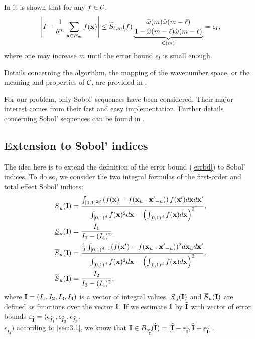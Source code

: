 In \cite[Sec. 4.2]{HicJim} it is shown that for any $f\in\mathcal{C}$,
\begin{equation}
\left\lvert I - \frac{1}{b^m}\sum_{\boldsymbol{\mathbf{x}}\in\mathcal{P}_m}f(\boldsymbol{\mathbf{x}})\right\rvert
\le \widetilde{S}_{\ell,m}(f)\underbrace{\frac{\widehat{\omega}(m) \mathring{\omega}(m-\ell)}{1 - \widehat{\omega}(m-\ell) \mathring{\omega}(m-\ell)}}_{\mathfrak{C}(m)}=\epsilon_{I}, \label{errbd}
\end{equation}
where one may increase $m$ until the error bound $\epsilon_{I}$ is small enough.

Details concerning the algorithm, the mapping of the wavenumber space, or the meaning and properties of $\mathcal{C}$, are provided in \cite{HicJim}. 

For our problem, only Sobol' sequences \cite{Sobol'seq} have been considered. Their major interest comes from their fast and easy implementation. Further details concerning Sobol' sequences can be found in \cite{Lemieuxbook,Niederreiter}.

\subsection{Extension to Sobol' indices}
\label{sec:3.2}
The idea here is to extend the definition of the error bound (\ref{errbd}) to Sobol' indices. To do so, we consider the two integral formulas of the first-order and total effect Sobol' indices:
\begin{align*}
\underline{S}_u(\boldsymbol{\mathbf{I}}) & = \frac{\int_{[0,1)^{2d}} \left(f(\boldsymbol{\mathbf{x}})-
f(\boldsymbol{\mathbf{x}}_u:{\boldsymbol{\mathbf{x}}'}_{-u})\right)f(\boldsymbol{\mathbf{x}}')d\boldsymbol{\mathbf{x}} d{\boldsymbol{\mathbf{x}}'}}{\int_{[0,1)^{d}} f(\boldsymbol{\mathbf{x}})^2 d{\boldsymbol{\mathbf{x}}}-\left(\int_{[0,1)^{d}} f(\boldsymbol{\mathbf{x}}) d{\boldsymbol{\mathbf{x}}}\right)^2}, \\ 
\underline{S}_u(\boldsymbol{\mathbf{I}}) & = \frac{I_1}{I_3-(I_4)^2}, \\
\overline{S}_u(\boldsymbol{\mathbf{I}}) & = \frac{\frac{1}{2}\int_{[0,1)^{d+1}}(f(\boldsymbol{\mathbf{x}}')-f(\boldsymbol{\mathbf{x}}_u:{\boldsymbol{\mathbf{x}}'}_{-u}))^2d\boldsymbol{\mathbf{x}}_u d{\boldsymbol{\mathbf{x}}'}}{\int_{[0,1)^{d}} f(\boldsymbol{\mathbf{x}})^2 d{\boldsymbol{\mathbf{x}}}-\left(\int_{[0,1)^{d}} f(\boldsymbol{\mathbf{x}}) d{\boldsymbol{\mathbf{x}}}\right)^2}, \\
\overline{S}_u(\boldsymbol{\mathbf{I}}) & = \frac{I_2}{I_3-(I_4)^2},
\end{align*}
where $\boldsymbol{\mathbf{I}}=(I_1,I_2,I_3,I_4)$ is a vector of integral values. $\underline{S}_u(\boldsymbol{\mathbf{I}})$ and $\overline{S}_u(\boldsymbol{\mathbf{I}})$ are defined as functions over the vector $\boldsymbol{\mathbf{I}}$. If we estimate $\boldsymbol{\mathbf{I}}$ by $\widehat{\boldsymbol{\mathbf{I}}}$ with vector of error bounds $\varepsilon_{\widehat{\boldsymbol{\mathbf{I}}}}=(\epsilon_{\widehat{I}_1},\epsilon_{\widehat{I}_2},\epsilon_{\widehat{I}_3}$,\\ $\epsilon_{\widehat{I}_4})$ according to \ref{sec:3.1}, we know that $\boldsymbol{\mathbf{I}}\in B_{\varepsilon_{\widehat{\boldsymbol{\mathbf{I}}}}}(\widehat{\boldsymbol{\mathbf{I}}})=[\widehat{\boldsymbol{\mathbf{I}}}-\varepsilon_{\widehat{\boldsymbol{\mathbf{I}}}},\widehat{\boldsymbol{\mathbf{I}}}+\varepsilon_{\widehat{\boldsymbol{\mathbf{I}}}} ]$. 

